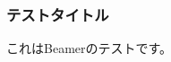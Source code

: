 \documentclass[dvipdfmx]{beamer}
\begin{document}
\begin{frame}
  \frametitle{テストタイトル}
  これはBeamerのテストです。
\end{frame}
\end{document}
